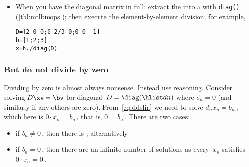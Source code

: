 \begin{compute}
\begin{itemize}
\item When you have the diagonal matrix in full:  extract the  into a  with \verb|diag()| (\cref{tbl:mtlbmops});  then execute the element-by-element division; for example,
\setbox\ajrqrbox\hbox{}%
\marginajrbox%
\begin{verbatim}
D=[2 0 0;0 2/3 0;0 0 -1]
b=[1;2;3]
x=b./diag(D)
\end{verbatim}
\end{itemize}

\end{compute}






\subsubsection{But do not divide by zero} 
Dividing by zero is almost always nonsense.
Instead use reasoning.
Consider solving \(D\xv=\bv\) for diagonal~\(D=\diag(\hlist dn)\) where \(d_n=0\) (and similarly if any others are zero).
From~\eqref{eq:ddslin} we need to solve \(d_nx_n=b_n\)\,, which here is \(0\cdot x_n=b_n\)\,, that is, \(0=b_n\)\,. 
There are two cases: 
\begin{itemize}
\item if \(b_n\neq 0\)\,, then there is ; alternatively
\item if \(b_n=0\)\,, then there are an infinite number of solutions as every~\(x_n\) satisfies \(0\cdot x_n=0\)\,.
\end{itemize}





